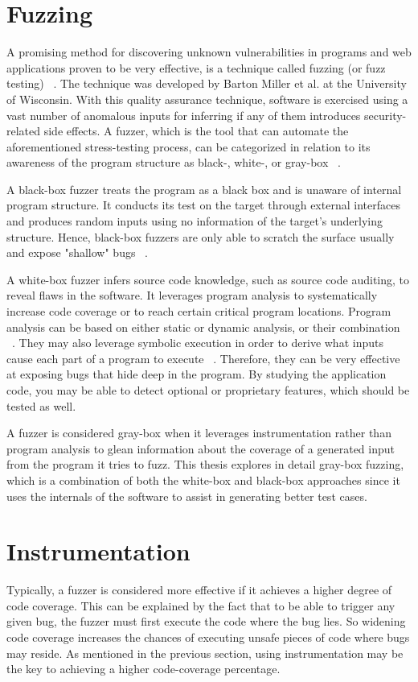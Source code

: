 \section{Fuzzing}
A promising method for discovering unknown vulnerabilities in
programs and web applications proven to be very effective, is a technique called fuzzing (or fuzz testing) ~\cite{fuzzing_def}. The technique was developed by Barton Miller et al. at the University of Wisconsin.
With this quality assurance technique, software is exercised using a vast number of anomalous inputs for inferring if any of them introduces security-related side effects. A fuzzer, which is the tool that can automate the aforementioned stress-testing process, can be categorized in relation to its awareness of the program structure as black-, white-, or gray-box ~\cite{fuzzing_book}. 

A black-box fuzzer treats the program as a black box and is unaware of
internal program structure. It conducts its test on the target through external
interfaces and produces random inputs using no information of the target's underlying structure. Hence,  black-box fuzzers are only able to scratch the surface usually and expose "shallow" bugs ~\cite{fuzzing_owasp}. 

A white-box fuzzer infers source code knowledge, such as source code auditing, to reveal
flaws in the software. It leverages program analysis to systematically
increase code coverage or to reach certain critical program locations. Program analysis can be based on either static or dynamic analysis, or their combination ~\cite{program_analysis_book}. They may also leverage symbolic execution in order to derive what inputs cause each part of a program to execute ~\cite{symbolic_exe}. Therefore, they can be very effective at exposing bugs that hide deep in the program. By studying the application code, you may be able to detect optional or proprietary features, which should be tested as well.

A fuzzer is considered gray-box when it leverages instrumentation rather than program analysis to glean information about the coverage of a generated input from the program it tries to fuzz. This thesis explores in detail gray-box fuzzing, which is a combination of both the white-box and black-box approaches since it uses the internals of the software to assist in generating better test cases.

\section{Instrumentation}
Typically, a fuzzer is considered more effective if it achieves a higher degree of code coverage. This can be explained by the fact that to be able to trigger any given bug, the fuzzer must first execute the code where the bug lies. So widening code coverage increases the chances of executing unsafe pieces of code where bugs may reside. As mentioned in the previous section, using instrumentation may be the key to achieving a higher code-coverage percentage. 

